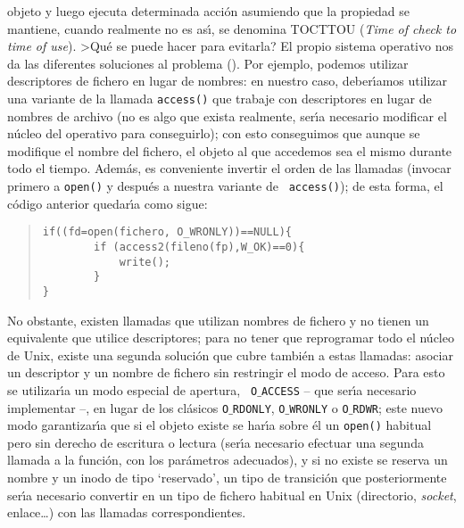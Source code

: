 objeto y luego ejecuta determinada acci\'on asumiendo que la propiedad se 
mantiene, cuando realmente no es as\'{\i}, se denomina TOCTTOU ({\it Time of
check to time of use}). >Qu\'e se puede hacer para evitarla? El propio sistema
operativo nos da las diferentes soluciones al problema (\cite{kn:bis96}). Por
ejemplo, podemos utilizar descriptores de fichero en lugar de nombres: en 
nuestro caso, deber\'{\i}amos utilizar una variante de la llamada {\tt access()}
que trabaje con descriptores en lugar de nombres de archivo (no es algo que
exista realmente, ser\'{\i}a necesario modificar el n\'ucleo del operativo 
para conseguirlo); con esto conseguimos que aunque
se modifique el nombre del fichero, el objeto al que accedemos sea el mismo 
durante todo el tiempo. Adem\'as, es conveniente invertir el orden de las 
llamadas (invocar primero a {\tt open()} y despu\'es a nuestra variante de {\tt 
access()}); de esta forma, el c\'odigo anterior quedar\'{\i}a como sigue:
\begin{quote}
\begin{verbatim}
if((fd=open(fichero, O_WRONLY))==NULL){
        if (access2(fileno(fp),W_OK)==0){
            write();
        }
}
\end{verbatim}
\end{quote}
No obstante, existen llamadas que utilizan nombres de fichero y no tienen un
equivalente que utilice descriptores; para no tener que reprogramar todo el
n\'ucleo de Unix, existe una segunda soluci\'on que cubre tambi\'en a estas
llamadas: asociar un descriptor y un nombre de fichero sin restringir el modo
de acceso. Para esto se utilizar\'{\i}a un modo especial de apertura, {\tt
O$\_$ACCESS} -- que ser\'{\i}a necesario implementar --, en lugar de los 
cl\'asicos {\tt O$\_$RDONLY}, {\tt O$\_$WRONLY} o {\tt O$\_$RDWR}; este nuevo
modo garantizar\'{\i}a que si el objeto existe se har\'{\i}a sobre \'el un
{\tt open()} habitual pero sin derecho de escritura o lectura (ser\'{\i}a 
necesario efectuar una segunda llamada a la funci\'on, con los par\'ametros
adecuados), y si no existe se reserva un nombre y un inodo de tipo `reservado',
un tipo de transici\'on que posteriormente ser\'{\i}a necesario convertir en un
tipo de fichero habitual en Unix (directorio, {\it socket}, enlace\ldots) con
las llamadas correspondientes.
